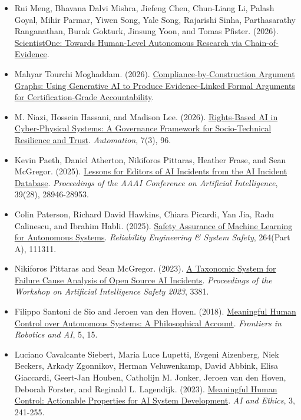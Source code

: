 \documentclass[11pt]{article}
\begin{document}
\begin{itemize}[leftmargin=*]
\item Rui Meng, Bhavana Dalvi Mishra, Jiefeng Chen, Chun-Liang Li, Palash Goyal, Mihir Parmar, Yiwen Song, Yale Song, Rajarishi Sinha, Parthasarathy Ranganathan, Burak Gokturk, Jinsung Yoon, and Tomas Pfister. (2026). \href{https://doi.org/10.48550/arXiv.2605.26340}{ScientistOne: Towards Human-Level Autonomous Research via Chain-of-Evidence}.
\item Mahyar Tourchi Moghaddam. (2026). \href{https://doi.org/10.48550/arXiv.2604.04103}{Compliance-by-Construction Argument Graphs: Using Generative AI to Produce Evidence-Linked Formal Arguments for Certification-Grade Accountability}.
\item M. Niazi, Hossein Hassani, and Madison Lee. (2026). \href{https://doi.org/10.3390/automation7030096}{Rights-Based AI in Cyber-Physical Systems: A Governance Framework for Socio-Technical Resilience and Trust}. \emph{Automation}, 7(3), 96.
\item Kevin Paeth, Daniel Atherton, Nikiforos Pittaras, Heather Frase, and Sean McGregor. (2025). \href{https://doi.org/10.1609/aaai.v39i28.35163}{Lessons for Editors of AI Incidents from the AI Incident Database}. \emph{Proceedings of the AAAI Conference on Artificial Intelligence}, 39(28), 28946-28953.
\item Colin Paterson, Richard David Hawkins, Chiara Picardi, Yan Jia, Radu Calinescu, and Ibrahim Habli. (2025). \href{https://doi.org/10.1016/j.ress.2025.111311}{Safety Assurance of Machine Learning for Autonomous Systems}. \emph{Reliability Engineering \& System Safety}, 264(Part A), 111311.
\item Nikiforos Pittaras and Sean McGregor. (2023). \href{https://ceur-ws.org/Vol-3381/17.pdf}{A Taxonomic System for Failure Cause Analysis of Open Source AI Incidents}. \emph{Proceedings of the Workshop on Artificial Intelligence Safety 2023}, 3381.
\item Filippo Santoni de Sio and Jeroen van den Hoven. (2018). \href{https://doi.org/10.3389/frobt.2018.00015}{Meaningful Human Control over Autonomous Systems: A Philosophical Account}. \emph{Frontiers in Robotics and AI}, 5, 15.
\item Luciano Cavalcante Siebert, Maria Luce Lupetti, Evgeni Aizenberg, Niek Beckers, Arkady Zgonnikov, Herman Veluwenkamp, David Abbink, Elisa Giaccardi, Geert-Jan Houben, Catholijn M. Jonker, Jeroen van den Hoven, Deborah Forster, and Reginald L. Lagendijk. (2023). \href{https://doi.org/10.1007/s43681-022-00167-3}{Meaningful Human Control: Actionable Properties for AI System Development}. \emph{AI and Ethics}, 3, 241-255.

\end{itemize}
\end{document}
